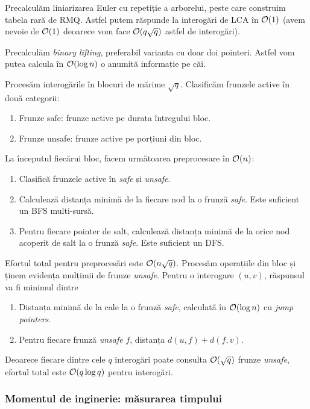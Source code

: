 \documentclass[../main.tex]{subfiles}
\begin{document}
Precalculăm liniarizarea Euler cu repetiție a arborelui, peste care construim tabela rară de RMQ. Astfel putem răspunde la interogări de LCA în $\mathcal{O}(1)$ (avem nevoie de $\mathcal{O}(1)$ deoarece vom face $\mathcal{O}(q \sqrt{q})$ astfel de interogări).

Precalculăm \textit{binary lifting}, preferabil varianta cu doar doi pointeri. Astfel vom putea calcula în $\mathcal{O}(\log n)$ o anumită informație pe căi.

Procesăm interogările în blocuri de mărime $\sqrt{q}$. Clasificăm frunzele active în două categorii:

\begin{enumerate}
  \item Frunze safe: frunze active pe durata întregului bloc.
  \item Frunze unsafe: frunze active pe porțiuni din bloc.
\end{enumerate}

La începutul fiecărui bloc, facem următoarea preprocesare în $\mathcal{O}(n)$:

\begin{enumerate}
  \item Clasifică frunzele active în \textit{safe} și \textit{unsafe}.
  \item Calculează distanța minimă de la fiecare nod la o frunză \textit{safe}. Este suficient un BFS multi-sursă.
  \item Pentru fiecare pointer de salt, calculează distanța minimă de la orice nod acoperit de salt la o frunză \textit{safe}. Este suficient un DFS.
\end{enumerate}

Efortul total pentru preprocesări este $\mathcal{O}(n \sqrt{q})$. Procesăm operațiile din bloc și ținem evidența mulțimii de frunze \textit{unsafe}. Pentru o interogare $(u,v)$, răspunsul va fi minimul dintre

\begin{enumerate}
  \item Distanța minimă de la cale la o frunză \textit{safe}, calculată în $\mathcal{O}(\log n)$ cu \textit{jump pointers}.
  \item Pentru fiecare frunză \textit{unsafe} $f$, distanța $d(u, f) + d(f, v)$.
\end{enumerate}

Deoarece fiecare dintre cele $q$ interogări poate consulta $\mathcal{O}(\sqrt{q})$ frunze \textit{unsafe}, efortul total este $\mathcal{O}(q \log q)$ pentru interogări.

\subsubsection*{Momentul de inginerie: măsurarea timpului}
\end{document}
